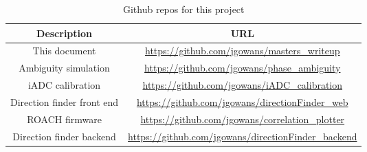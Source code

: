 \begin{table}
  \centering
  \begin{tabu}{c|c}
    Description & URL \\
    \hline
    This document & \url{https://github.com/jgowans/masters_writeup} \\
    Ambiguity simulation & \url{https://github.com/jgowans/phase_ambiguity} \\
    iADC calibration & \url{https://github.com/jgowans/iADC_calibration} \\
    Direction finder front end & \url{https://github.com/jgowans/directionFinder_web} \\
    ROACH firmware & \url{https://github.com/jgowans/correlation_plotter} \\
    Direction finder backend & \url{https://github.com/jgowans/directionFinder_backend} \\
  \end{tabu}
  \caption{Github repos for this project}
  \label{tab:lit-review-repos}
\end{table}
